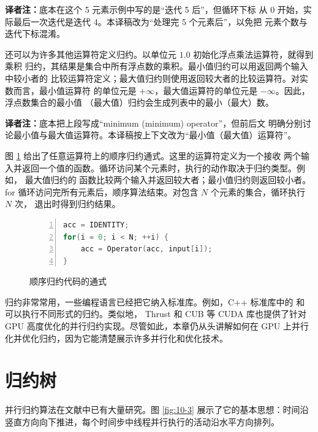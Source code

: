 \noindent\textbf{译者注：}底本在这个 5 元素示例中写的是“迭代 5 后”，但循环下标
从 0 开始，实际最后一次迭代是迭代 4。本译稿改为“处理完 5 个元素后”，以免把
元素个数与迭代下标混淆。

还可以为许多其他运算符定义归约。以单位元 $1.0$ 初始化浮点乘法运算符，就得到乘积
归约，其结果是集合中所有浮点数的乘积。最小值归约可以用返回两个输入中较小者的
比较运算符定义；最大值归约则使用返回较大者的比较运算符。对实数而言，最小值运算符
的单位元是 $+\infty$，最大值运算符的单位元是 $-\infty$。因此，浮点数集合的最小值
（最大值）归约会生成列表中的最小（最大）数。

\noindent\textbf{译者注：}底本把上段写成“minimum (minimum) operator”，但前后文
明确分别讨论最小值与最大值运算符。本译稿按上下文改为“最小值（最大值）运算符”。

图 \ref{fig:10-2} 给出了任意运算符上的顺序归约通式。这里的运算符定义为一个接收
两个输入并返回一个值的函数。循环访问某个元素时，执行的动作取决于归约类型。例如，
最大值归约的  函数比较两个输入并返回较大者；最小值归约则返回较小者。
for 循环访问完所有元素后，顺序算法结束。对包含 $N$ 个元素的集合，循环执行 $N$ 次，
退出时得到归约结果。

\begin{figure}[htbp]
  \centering
  \begin{minipage}{0.88\textwidth}
  \begin{lstlisting}[language=C++,numbers=left]
acc = IDENTITY;
for(i = 0; i < N; ++i) {
    acc = Operator(acc, input[i]);
}
  \end{lstlisting}
  \end{minipage}
  \caption{顺序归约代码的通式}
  \label{fig:10-2}
\end{figure}

归约非常常用，一些编程语言已经把它纳入标准库。例如，C++ 标准库中的
 和  可以执行不同形式的归约。类似地，
Thrust\cite{bell2012thrust,nvidia-thrust2025} 和 CUB\cite{nvidia-cub2025} 等 CUDA
库也提供了针对 GPU 高度优化的并行归约实现。尽管如此，本章仍从头讲解如何在 GPU
上并行化并优化归约，因为它能清楚展示许多并行化和优化技术。

\section{归约树}
\label{sec:reduction-trees}

并行归约算法在文献中已有大量研究。图 \ref{fig:10-3} 展示了它的基本思想：时间沿
竖直方向向下推进，每个时间步中线程并行执行的活动沿水平方向排列。

